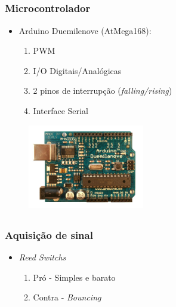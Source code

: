 \documentclass{beamer}
\begin{document}
\subsection{}
\begin{frame}
  \frametitle{Microcontrolador}
  \begin{itemize}
  \item Arduino Duemilenove (AtMega168):
    \begin{enumerate}
      \item PWM
      \item I/O Digitais/Analógicas
      \item 2 pinos de interrupção (\textit{falling/rising})
      \item Interface Serial
    \end{enumerate}
  \end{itemize}
\begin{figure}[h]
\begin{center}
 \includegraphics[width=2in]{duemilanove}
\end{center}
\end{figure}
\end{frame}

\subsection{}
\begin{frame}
  \frametitle{Aquisição de sinal}
  \begin{itemize}
    \item \textit{Reed Switchs}
    \begin{enumerate}
      \item Pró - Simples e barato
      \item Contra - \textit{Bouncing}
    \end{enumerate}
  \end{itemize}

\begin{figure}[h!]
 \centering
   \hfil
  \label{fig:reed}
\end{figure}
\end{frame}
\end{document}
